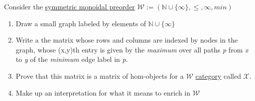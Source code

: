 Consider the \href{doc/1 math/Seven Sketches in Compositionality/Chapter 2: Resource theories/2 Symmetric monoidal preorders/1 Definition and first examples/1 Symmetric monoidal structure on a preorder}{symmetric monoidal preorder} $\mathcal{W}:=(\mathbb{N}\cup\{\infty\},\leq,\infty,min)$
    \begin{enumerate}
      \item Draw a small graph labeled by elements of $\mathbb{N}\cup\{\infty\}$
      \item Write a the matrix whose rows and columns are indexed by nodes in the graph, whose (x,y)th entry is given by the \emph{maximum} over all paths \emph{p} from \emph{x} to \emph{y} of the \emph{minimum} edge label in \emph{p}.
      \item Prove that this matrix is a matrix of hom-objects for a $\mathcal{W}$ \href{doc/1 math/Seven Sketches in Compositionality/Chapter 2: Resource theories/3 Enrichment/1 V-categories/1 V-category}{category} called $\mathcal{X}$.
      \item Make up an interpretation for what it means to enrich in $\mathcal{W}$
    \end{enumerate}